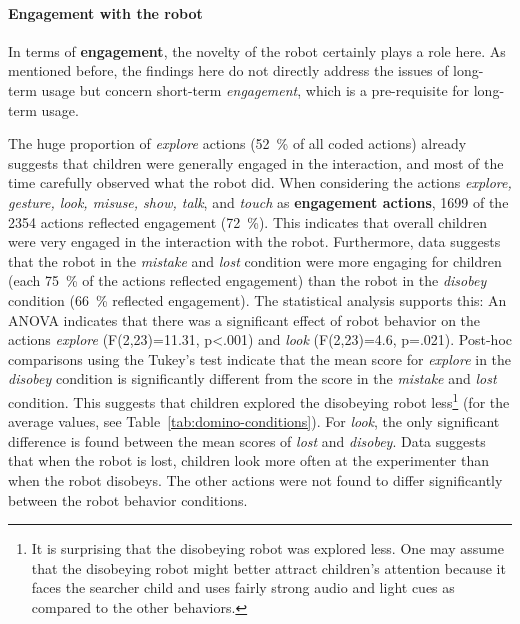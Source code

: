 \documentclass{sig-alternate}
\begin{document}
\paragraph{Engagement with the robot}	
\label{sec:domino-engagement}

In terms of \textbf{engagement}, the novelty of the robot certainly plays a role
here. As mentioned before, the findings here do not directly address the issues
of long-term usage but concern short-term \textit{engagement}, which is a
pre-requisite for long-term usage.


The huge proportion of \textit{explore} actions (52~\% of all coded actions)
already suggests that children were generally engaged in the interaction, and
most of the time carefully observed what the robot did. When considering the
actions \textit{explore, gesture, look, misuse, show, talk}, and \textit{touch}
as \textbf{engagement actions}, 1699 of the 2354 actions reflected engagement
(72~\%). This indicates that overall children were very engaged in the
interaction with the robot. Furthermore, data suggests that the robot in the
\textit{mistake} and \textit{lost} condition were more engaging for children
(each 75~\% of the actions reflected engagement) than the robot in the
\textit{disobey} condition (66~\% reflected engagement). The statistical
analysis supports this: An ANOVA indicates that there was a significant effect
of robot behavior on the actions \textit{explore} (F(2,23)=11.31, p<.001) and
\textit{look} (F(2,23)=4.6, p=.021). Post-hoc comparisons using the Tukey's test
indicate that the mean score for \textit{explore} in the \textit{disobey}
condition is significantly different from the score in the \textit{mistake} and
\textit{lost} condition. This suggests that children explored the disobeying
robot less\footnote{It is surprising that the disobeying robot was explored
less. One may assume that the disobeying robot might better attract children's
attention because it faces the searcher child and uses fairly strong audio and
light cues as compared to the other behaviors.} (for the average values, see
Table~\ref{tab:domino-conditions}). For \textit{look}, the only significant
difference is found between the mean scores of \textit{lost} and
\textit{disobey}. Data suggests that when the robot is lost, children look more
often at the experimenter than when the robot disobeys. The other actions were
not found to differ significantly between the robot behavior conditions.	
\end{document}
